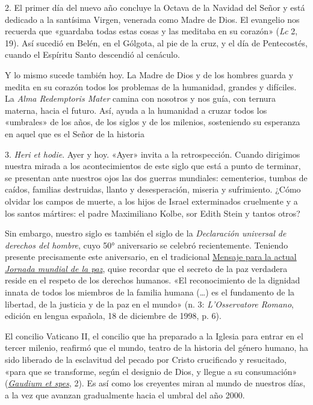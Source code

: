 2. El primer día del nuevo año concluye la Octava de la Navidad del
Señor y está dedicado a la santísima Virgen, venerada como Madre de
Dios. El evangelio nos recuerda que «guardaba todas estas cosas y las
meditaba en su corazón» (\emph{Lc} 2, 19). Así sucedió en Belén, en el
Gólgota, al pie de la cruz, y el día de Pentecostés, cuando el Espíritu
Santo descendió al cenáculo.

Y lo mismo sucede también hoy. La Madre de Dios y de los hombres guarda
y medita en su corazón todos los problemas de la humanidad, grandes y
difíciles. La \emph{Alma Redemptoris Mater} camina con nosotros y nos
guía, con ternura materna, hacia el futuro. Así, ayuda a la humanidad a
cruzar todos los «umbrales» de los años, de los siglos y de los
milenios, sosteniendo su esperanza en aquel que es el Señor de la
historia

3. \emph{Heri et hodie}. Ayer y hoy. «Ayer» invita a la retrospección.
Cuando dirigimos nuestra mirada a los acontecimientos de este siglo que
está a punto de terminar, se presentan ante nuestros ojos las dos
guerras mundiales: cementerios, tumbas de caídos, familias destruidas,
llanto y desesperación, miseria y sufrimiento. ¿Cómo olvidar los campos
de muerte, a los hijos de Israel exterminados cruelmente y a los santos
mártires: el padre Maximiliano Kolbe, sor Edith Stein y tantos otros?

Sin embargo, nuestro siglo es también el siglo de la \emph{Declaración
	universal de derechos del hombre}, cuyo 50° aniversario se celebró
recientemente. Teniendo presente precisamente este aniversario, en el
tradicional
\href{http://w2.vatican.va/content/john-paul-ii/es/messages/peace/documents/hf_jp-ii_mes_14121998_xxxii-world-day-for-peace.html}{Mensaje
	para la actual \emph{Jornada mundial de la paz}}, quise recordar que el
secreto de la paz verdadera reside en el respeto de los derechos
humanos. «El reconocimiento de la dignidad innata de todos los miembros
de la familia humana (\ldots{}) es el fundamento de la libertad, de la
justicia y de la paz en el mundo» (n. 3: \emph{L'Osservatore Romano},
edición en lengua española, 18 de diciembre de 1998, p. 6).

El concilio Vaticano II, el concilio que ha preparado a la Iglesia para
entrar en el tercer milenio, reafirmó que el mundo, teatro de la
historia del género humano, ha sido liberado de la esclavitud del pecado
por Cristo crucificado y resucitado, «para que se transforme, según el
designio de Dios, y llegue a su consumación»
(\emph{\href{http://www.vatican.va/archive/hist_councils/ii_vatican_council/documents/vat-ii_const_19651207_gaudium-et-spes_sp.html}{Gaudium
		et spes}}, 2). Es así como los creyentes miran al mundo de nuestros
días, a la vez que avanzan gradualmente hacia el umbral del año 2000.

